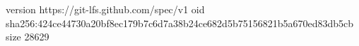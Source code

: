 version https://git-lfs.github.com/spec/v1
oid sha256:424ce44730a20bf8ec179b7c6d7a38b24ce682d5b75156821b5a670ed83db5cb
size 28629
